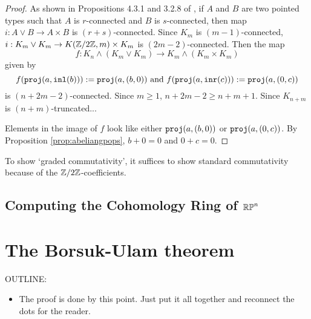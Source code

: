 \documentclass{amsart}
\begin{document}
\begin{proof}
	As shown in Propositions 4.3.1 and 3.2.8 of \cite{brunerie:thesis}, if $A$ and $B$ are two pointed types such that $A$ is $r$-connected and $B$ is $s$-connected, then map $i:A\vee B\to A\times B$ is $(r+s)$-connected. Since $K_{m}$ is $(m-1)$-connected, $i:K_{m}\vee K_{m}\to K(\mathbb{Z}/2\mathbb{Z},m)\times K_{m}$ is $(2m-2)$-connected. Then the map 
	\[f:K_{n}\wedge\left(K_{m}\vee K_{m}\right)\to K_{m}\wedge\left(K_{m}\times K_{m}\right)\]
	given by 
	\[f(\mathtt{proj}(a,\mathtt{inl}(b))):=\mathtt{proj}(a,(b,0))\text{~and~} f(\mathtt{proj}(a,\mathtt{inr}(c))):=\mathtt{proj}(a,(0,c))\]
	is $(n+2m-2)$-connected. Since $m\geq 1$, $n+2m-2\geq n+m+1$. Since $K_{n+m}$ is $(n+m)$-truncated...
	
	Elements in the image of $f$ look like either $\mathtt{proj}(a,(b,0))$ or $\mathtt{proj}(a,(0,c))$. By Proposition \ref{prop:abeliangpops}, $b+0=0$ and $0+c=0$. 
	

	
	\end{proof}



 To show
`graded commutativity', it suffices to show standard
commutativity because of the $ \mathbb{Z}/2\mathbb{Z} $-coefficients.  




\subsection{Computing the Cohomology Ring of $\mathbb{RP}^n$}




\section{The Borsuk-Ulam theorem}
\label{sec:borsuk-ulam}

OUTLINE:
\begin{itemize}
\item
  The proof is done by this point. Just put it all
  together and reconnect the dots for the reader.
\end{itemize}



\nocite{shul:bfp,brunerie:thesis,br:rp-hott}

\end{document}
